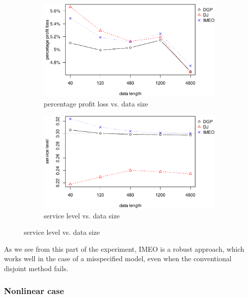 \documentclass[a4paper,11pt]{article}
\begin{document}
\begin{figure}[ht]
\centering
\caption{Performance vs. sample size with Laplace distributed error term}
\begin{subfigure}[b]{0.48\textwidth}
\centering
\includegraphics[width=\textwidth]{laplaceppl.pdf}
\caption{percentage profit loss vs. data size}
\end{subfigure}
\hfill
\begin{subfigure}[b]{0.48\textwidth}
\centering
\includegraphics[width=\textwidth]{laplacesl.pdf}
\caption{service level vs. data size}
\end{subfigure}
\label{fig:err}
\end{figure}

As we see from this part of the experiment, IMEO is a robust approach, which works well in the case of a misspecified model, even when the conventional disjoint method fails.

\subsubsection{Nonlinear case} \label{sub:exp4}
\end{document}
